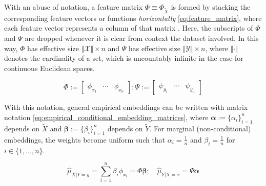 \documentclass[twoside]{article} \usepackage{aistats2017}
\theoremstyle{definition}
\theoremstyle{theorem}
\newcommand{\rv}[1]{{#1}}
\newcommand{\ds}[1]{\tilde{#1}}
\newcommand{\hatmuYx}{\hat{\mu}_{\rv{Y} | \rv{X} = x}}
\newcommand{\hatmuXy}{\hat{\mu}_{\rv{X} | \rv{Y} = y}}
\newcommand{\cardX}{\Vert \mathcal{X} \Vert}
\newcommand{\cardY}{\Vert \mathcal{Y} \Vert}
\begin{document}
%			
%			
%			
			With an abuse of notation, a feature matrix $\Phi \equiv \Phi_{\ds{X}}$ is formed by stacking the corresponding feature vectors or functions \textit{horizontally} \eqref{eq:feature_matrix}, where each feature vector represents a column of that matrix  \citep{muandet2016kernel}. Here, the subscripts of $\Phi$ and $\Psi$ are dropped whenever it is clear from context the dataset involved. In this way, $\Phi$ has effective size $\cardX \times n$ and $\Psi$ has effective size $\cardY \times n$, where $\Vert \cdot \Vert$ denotes the cardinality of a set, which is uncountably infinite in the case for continuous Euclidean spaces.
				
			\begin{equation}
				\Phi := \begin{bmatrix} \phi_{x_{1}} & \cdots & \phi_{x_{n}} \end{bmatrix}; \Psi := \begin{bmatrix} \psi_{y_{1}} & \cdots & \psi_{y_{n}} \end{bmatrix}
			\label{eq:feature_matrix}
			\end{equation}
				

			With this notation, general empirical embeddings can be written with matrix notation \eqref{eq:empirical_conditional_embedding_matrices}, where $\bm{\alpha} := \{\alpha_{i}\}_{i = 1}^{n}$ depends on $\ds{X}$ and $\bm{\beta} := \{\beta_{i}\}_{i = 1}^{n}$ depends on $\ds{Y}$. For marginal (non-conditional) embeddings, the weights become uniform such that $\alpha_{i} = \frac{1}{n}$ and $\beta_{i} = \frac{1}{n}$ for $i \in \{1, \dots, n\}$.
			
			\begin{equation}
				\hatmuXy = \sum_{i = 1}^{n} \beta_{i} \phi_{x_{i}} = \Phi \bm{\beta} ;\quad \hatmuYx = \Psi \bm{\alpha}
			\label{eq:empirical_conditional_embedding_matrices}
			\end{equation}
				
\end{document}
